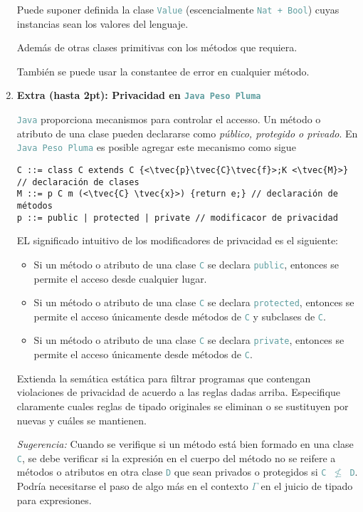 \documentclass{article}
\newcommand{\tx}[1]{\textcolor{Black} {\texttt{#1}}}
\newcommand{\tp}[1]{\textcolor{CadetBlue} {\texttt{#1}}}
\newcommand{\tb}[1]{\textcolor{RoyalPurple} {\textbf{#1}}}
\newcommand{\ti}[1]{\textcolor{RoyalPurple} {\textit{#1}}}
\newcommand{\pt}[1]{\textcolor{RoyalPurple}{(#1pt)}}
\newcommand{\tvec}[1]{$\vec{\tx{#1}}$ }
\begin{document}
\begin{enumerate}
        Puede suponer definida la clase \tp{Value} (escencialmente
        \tp{Nat + Bool}) cuyas instancias sean los valores del lenguaje.

        Además de otras clases primitivas con los métodos que requiera.

        También se puede usar la constantee de error en cualquier método.

        \item \tb{Extra \pt{hasta 2}: Privacidad en \tp{Java Peso Pluma}}

        \tp{Java} proporciona mecanismos para controlar el accesso. Un método o
        atributo de una clase pueden declararse como \ti{público, protegido o
        privado}. En \tp{Java Peso Pluma} es posible agregar este mecanismo como
        sigue

        \begin{verbatim}
C ::= class C extends C {<\tvec{p}\tvec{C}\tvec{f}>;K <\tvec{M}>} // declaración de clases
M ::= p C m (<\tvec{C} \tvec{x}>) {return e;} // declaración de métodos
p ::= public | protected | private // modificacor de privacidad
        \end{verbatim}

        EL significado intuitivo de los modificadores de privacidad es el
        siguiente:

        \begin{itemize}
            \item Si un método o atributo de una clase \tp{C} se declara
            \tp{public}, entonces se permite el acceso desde cualquier lugar.

            \item Si un método o atributo de una clase \tp{C} se declara
            \tp{protected}, entonces se permite el acceso únicamente desde
            métodos de \tp{C} y subclases de \tp{C}.

            \item Si un método o atributo de una clase \tp{C} se declara
            \tp{private}, entonces se permite el acceso únicamente desde
            métodos de \tp{C}.
        \end{itemize}

        Extienda la semática estática para filtrar programas que contengan
        violaciones de privacidad de acuerdo a las reglas dadas arriba.
        Especifique claramente cuales reglas de tipado originales se eliminan o
        se sustituyen por nuevas y cuáles se mantienen.

        \ti{Sugerencia:} Cuando se verifique si un método está bien formado en
        una clase \tp{C}, se debe verificar si la expresión en el cuerpo del
        método no se reifere a métodos o atributos en otra clase \tp{D} que sean
        privados o protegidos si \tp{C $\not \leq$ D}. Podría necesitarse el
        paso de algo más en el contexto \tp{$\Gamma$} en el juicio de tipado
        para expresiones.

    \end{enumerate}
\end{document}
